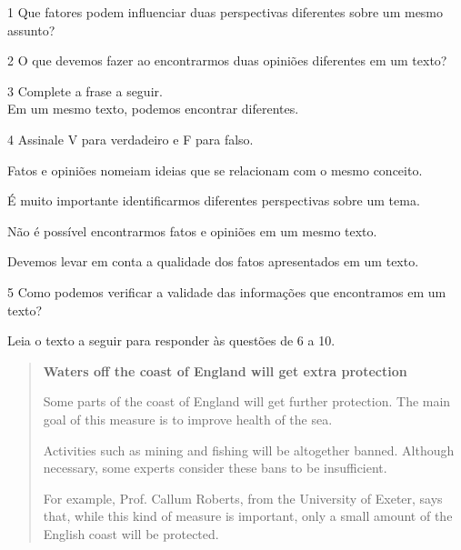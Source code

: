 \num{1} Que fatores podem influenciar duas perspectivas diferentes sobre um
mesmo assunto?



\num{2} O que devemos fazer ao encontrarmos duas opiniões diferentes em um texto?



\num{3} Complete a frase a seguir.\\
Em um mesmo texto, podemos encontrar \preencher diferentes.


\num{4} Assinale V para verdadeiro e F para falso.

\begin{boxlist}
\item Fatos e opiniões nomeiam ideias que se relacionam com o mesmo conceito. 

\item É muito importante identificarmos diferentes perspectivas sobre um
tema. 

\item Não é possível encontrarmos fatos e opiniões em um mesmo texto. 

\item Devemos levar em conta a qualidade dos fatos apresentados em um
texto. 
\end{boxlist}

\num{5} Como podemos verificar a validade das informações que encontramos em um texto?



Leia o texto a seguir para responder às questões de 6 a 10.


\begin{quote}
\textbf{Waters off the coast of England will get extra protection}

Some parts of the coast of England will get further protection. The main goal of this measure is to improve health of the sea.

Activities such as mining and fishing will be altogether banned. Although necessary, some experts consider these bans to be insufficient.

For example, Prof. Callum Roberts, from the University of Exeter, says that, while this kind of measure is important, only a small amount of the English coast will be protected. 

\end{quote}


